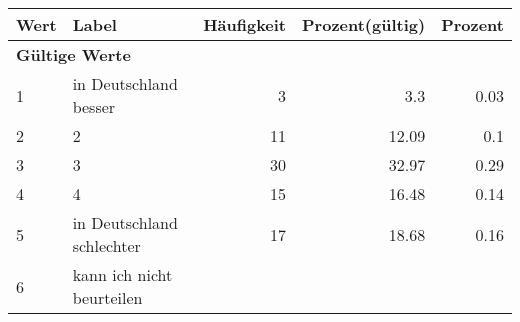      \begin{longtable}{lXrrr}
     \toprule
     \textbf{Wert} & \textbf{Label} & \textbf{Häufigkeit} & \textbf{Prozent(gültig)} & \textbf{Prozent} \\
     \endhead
     \midrule
     \multicolumn{5}{l}{\textbf{Gültige Werte}}\\

     1 &
     \multicolumn{1}{X}{ in Deutschland besser   } &


       \num{3} &
       \num[round-mode=places,round-precision=2]{3,3} &
         \num[round-mode=places,round-precision=2]{0,03} \\

     2 &
     \multicolumn{1}{X}{ 2   } &


       \num{11} &
       \num[round-mode=places,round-precision=2]{12,09} &
         \num[round-mode=places,round-precision=2]{0,1} \\

     3 &
     \multicolumn{1}{X}{ 3   } &


       \num{30} &
       \num[round-mode=places,round-precision=2]{32,97} &
         \num[round-mode=places,round-precision=2]{0,29} \\

     4 &
     \multicolumn{1}{X}{ 4   } &


       \num{15} &
       \num[round-mode=places,round-precision=2]{16,48} &
         \num[round-mode=places,round-precision=2]{0,14} \\

     5 &
     \multicolumn{1}{X}{ in Deutschland schlechter   } &


       \num{17} &
       \num[round-mode=places,round-precision=2]{18,68} &
         \num[round-mode=places,round-precision=2]{0,16} \\

     6 &
     \multicolumn{1}{X}{ kann ich nicht beurteilen   } &



\end{longtable}
